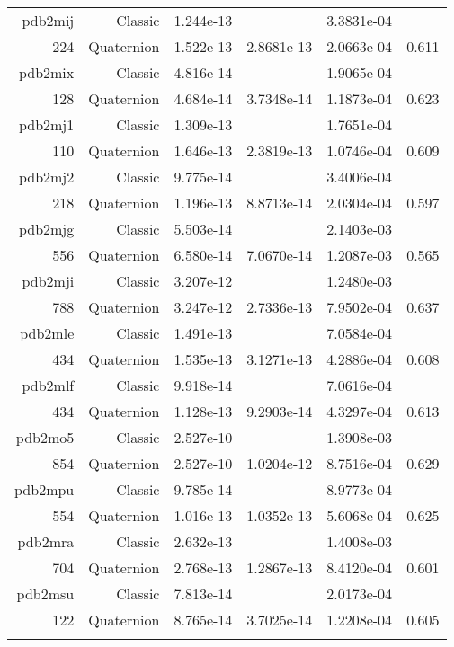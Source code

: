 \begin{xltabular}{\textwidth}{r|rS[table-format=1.3e+2]S[table-format=1.4e+2]S[table-format=1.4e+2]S[table-format=-1.3]}
pdb2mij & Classic & 1.244e-13 &  & 3.3831e-04 & \\
224 & Quaternion & 1.522e-13 & 2.8681e-13 & 2.0663e-04 & 0.611\\  \addlinespace
pdb2mix & Classic & 4.816e-14 &  & 1.9065e-04 & \\
128 & Quaternion & 4.684e-14 & 3.7348e-14 & 1.1873e-04 & 0.623\\  \addlinespace
pdb2mj1 & Classic & 1.309e-13 &  & 1.7651e-04 & \\
110 & Quaternion & 1.646e-13 & 2.3819e-13 & 1.0746e-04 & 0.609\\  \addlinespace
pdb2mj2 & Classic & 9.775e-14 &  & 3.4006e-04 & \\
218 & Quaternion & 1.196e-13 & 8.8713e-14 & 2.0304e-04 & 0.597\\  \addlinespace
pdb2mjg & Classic & 5.503e-14 &  & 2.1403e-03 & \\
556 & Quaternion & 6.580e-14 & 7.0670e-14 & 1.2087e-03 & 0.565\\  \addlinespace
pdb2mji & Classic & 3.207e-12 &  & 1.2480e-03 & \\
788 & Quaternion & 3.247e-12 & 2.7336e-13 & 7.9502e-04 & 0.637\\  \addlinespace
pdb2mle & Classic & 1.491e-13 &  & 7.0584e-04 & \\
434 & Quaternion & 1.535e-13 & 3.1271e-13 & 4.2886e-04 & 0.608\\  \addlinespace
pdb2mlf & Classic & 9.918e-14 &  & 7.0616e-04 & \\
434 & Quaternion & 1.128e-13 & 9.2903e-14 & 4.3297e-04 & 0.613\\  \addlinespace
pdb2mo5 & Classic & 2.527e-10 &  & 1.3908e-03 & \\
854 & Quaternion & 2.527e-10 & 1.0204e-12 & 8.7516e-04 & 0.629\\  \addlinespace
pdb2mpu & Classic & 9.785e-14 &  & 8.9773e-04 & \\
554 & Quaternion & 1.016e-13 & 1.0352e-13 & 5.6068e-04 & 0.625\\  \addlinespace
pdb2mra & Classic & 2.632e-13 &  & 1.4008e-03 & \\
704 & Quaternion & 2.768e-13 & 1.2867e-13 & 8.4120e-04 & 0.601\\  \addlinespace
pdb2msu & Classic & 7.813e-14 &  & 2.0173e-04 & \\
122 & Quaternion & 8.765e-14 & 3.7025e-14 & 1.2208e-04 & 0.605\\  \addlinespace

\end{xltabular}
